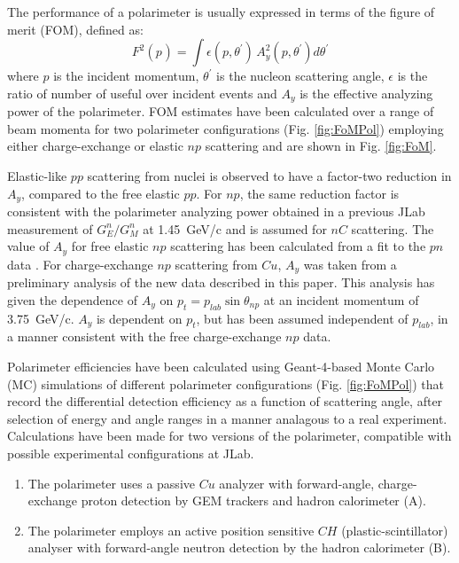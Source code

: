 \documentclass[epj]{svjour}
\begin{document}
The performance of a polarimeter is usually expressed in terms of 
the figure of merit (FOM),  defined as: 
\begin{equation}
F^{2}(p_{})=\int\epsilon(p,\theta^{'})\,A_{y}^{2}(p,\theta^{'})d\theta^{'}
\label{eq:FOM}
\end{equation}
where $p$ is the incident momentum, $\theta^{'}$ is the nucleon scattering angle, $\epsilon$ is the ratio of number of useful over incident events and $A_y$ is the effective analyzing power of the polarimeter. FOM estimates have been calculated over a range of beam momenta for two polarimeter configurations
(Fig. \ref{fig:FoMPol}) employing either charge-exchange or elastic $np$
scattering and are shown in Fig. \ref{fig:FoM}.

Elastic-like $pp$ scattering from nuclei is observed to have a factor-two
reduction in $A_{y}$,  compared to the free elastic $pp$. For $np$, the same reduction factor is consistent with the
polarimeter analyzing power obtained in a previous JLab measurement
of $ G_{E}^{n}/G_{M}^{n} $ \cite{Plaster:2005cx,Madey:2003av} at 1.45~GeV/c and is assumed for $nC$ scattering.
The value of $A_{y}$ for free elastic $np$ scattering has been
calculated from a fit  to the $pn$ data \cite{Ladygin:409018}. For charge-exchange $np$ scattering from $Cu$, $A_{y}$
was taken from a preliminary analysis of the new data described in
this paper. This analysis has given the dependence of $A_{y}$ on
$p_{t}=p_{lab}\sin\theta_{np}$ at an incident momentum of 3.75~GeV/c.
$A_{y}$ is dependent on $p_{t}$, but has been assumed independent
of $p_{lab}$, in a manner consistent with the free charge-exchange
$np$ data.

Polarimeter efficiencies have been calculated using Geant-4-based Monte Carlo (MC)
simulations of different polarimeter configurations (Fig. \ref{fig:FoMPol}) that record the differential detection
efficiency as a function of scattering angle, after selection of energy and angle ranges in a manner analagous to a real experiment. Calculations have been made for two versions of the polarimeter, compatible
with possible experimental configurations at JLab. 
\begin{enumerate}
\item The polarimeter uses a passive $Cu$ analyzer with forward-angle, charge-exchange
proton detection by GEM trackers and hadron calorimeter (A).
\item The polarimeter employs an active position sensitive $CH$ (plastic-scintillator)
analyser with forward-angle neutron detection by the hadron calorimeter (B).
\end{enumerate}
\end{document}
